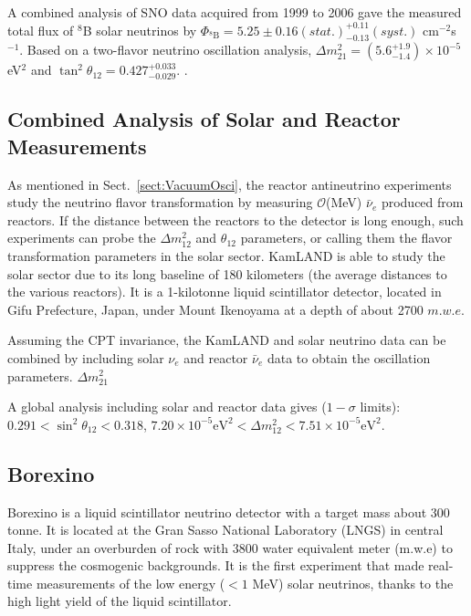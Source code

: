 A combined analysis of SNO data acquired from 1999 to 2006 gave the measured total flux of $^8$B solar neutrinos by $\Phi_{^8\mathrm{B}}=5.25\pm0.16(stat.)^{+0.11}_{-0.13}(syst.)$ cm$^{-2}$s$^{-1}$. Based on a two-flavor neutrino oscillation analysis, $\Delta m^2_{21}=(5.6^{+1.9}_{-1.4})\times 10^{-5}$ eV$^2$ and $\tan^2\theta_{12}=0.427^{+0.033}_{-0.029}$.
\cite{aharmim2013combined}.

\subsection{Combined Analysis of Solar and Reactor Measurements}
As mentioned in Sect.~\ref{sect:VacuumOsci}, the reactor antineutrino experiments study the neutrino flavor transformation by measuring $\mathcal{O}$(MeV) $\bar{\nu}_e$ produced from reactors. If the distance between the reactors to the detector is long enough, such experiments can probe the $\Delta m^2_{12}$ and $\theta_{12}$ parameters, or calling them the flavor transformation parameters in the solar sector. KamLAND is able to study the solar sector due to its long baseline of 180 kilometers (the average distances to the various reactors). It is a 1-kilotonne liquid scintillator detector, located in Gifu Prefecture, Japan, under
Mount Ikenoyama at a depth of about 2700 $m.w.e$\cite{abe2008precision}.

Assuming the CPT invariance, the KamLAND and solar neutrino data can be combined by including solar $\nu_e$ and reactor $\bar{\nu}_e$ data to obtain the oscillation parameters.
$\Delta m^2_{21}$

A global analysis including solar and reactor data gives ($1-\sigma$ limits)\cite{oberauer2020solar,}:
$0.291<\sin^2\theta_{12}<0.318$,
$7.20\times 10^{-5}\mathrm{eV}^2<\Delta m^2_{12}<7.51\times 10^{-5}\mathrm{eV}^2$.



\subsection{Borexino}
Borexino is a liquid scintillator neutrino detector with a target mass about 300 tonne. It is located at the Gran Sasso National Laboratory (LNGS) in central Italy, under an overburden of rock with 3800 water equivalent meter (m.w.e) to suppress the cosmogenic backgrounds. It is the first experiment that made real-time measurements of the low energy ($<1$ MeV) solar neutrinos, thanks to the high light yield of the liquid scintillator.

